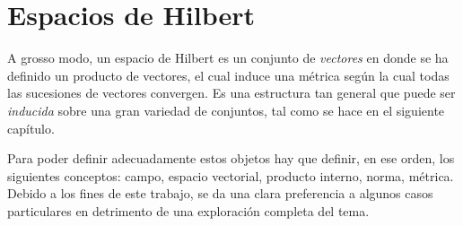\documentclass[12pt,letterpaper]{book}
\begin{document}

\section{Espacios de Hilbert}

A grosso modo, un espacio de Hilbert es un conjunto de \textit{vectores} en donde se ha definido un producto de vectores, el cual induce una métrica según la cual todas las sucesiones de vectores convergen.
%
Es una estructura tan general que puede ser \textit{inducida} sobre una gran variedad de conjuntos, tal como se hace en el siguiente capítulo.

Para poder definir adecuadamente estos objetos hay que definir, en ese orden, los siguientes conceptos: campo, espacio vectorial, producto interno, norma, métrica.
%
Debido a los fines de este trabajo, se da una clara preferencia a algunos casos particulares en detrimento de una exploración completa del tema.
\end{document}
